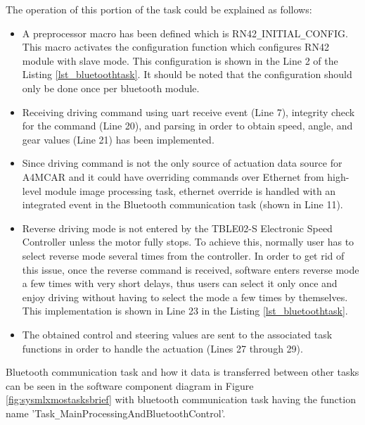 The operation of this portion of the task could be explained as follows:
\begin{itemize}
	\item A preprocessor macro has been defined which is RN42\texttt{\_}INITIAL\texttt{\_}CONFIG. This macro activates the configuration function which configures RN42 module with slave mode. This configuration is shown in the Line 2 of the Listing \ref{lst_bluetoothtask}. It should be noted that the configuration should only be done once per bluetooth module.
	\item Receiving driving command using uart receive event (Line 7), integrity check for the command (Line 20), and parsing in order to obtain speed, angle, and gear values (Line 21) has been implemented.
	\item Since driving command is not the only source of actuation data source for A4MCAR and it could have overriding commands over Ethernet from high-level module image processing task, ethernet override is handled with an integrated event in the Bluetooth communication task (shown in Line 11).
	\item Reverse driving mode is not entered by the TBLE02-S Electronic Speed Controller unless the motor fully stops. To achieve this, normally user has to select reverse mode several times from the controller. In order to get rid of this issue, once the reverse command is received, software enters reverse mode a few times with very short delays, thus users can select it only once and enjoy driving without having to select the mode a few times by themselves. This implementation is shown in Line 23 in the Listing \ref{lst_bluetoothtask}.
	\item The obtained control and steering values are sent to the associated task functions in order to handle the actuation (Lines 27 through 29).
\end{itemize}


Bluetooth communication task and how it data is transferred between other tasks can be seen in the software component diagram in Figure \ref{fig:sysmlxmostasksbrief} with bluetooth communication task having the function name 'Task\texttt{\_}MainProcessingAndBluetoothControl'.

